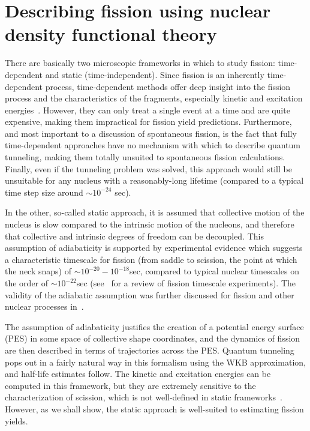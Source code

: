 \chapter{Describing fission using nuclear density functional theory}\label{chap:Model}


There are basically two microscopic frameworks in which to study fission: time-dependent and static (time-independent). Since fission is an inherently time-dependent process, time-dependent methods offer deep insight into the fission process and the characteristics of the fragments, especially kinetic and excitation energies~\cite{Scamps2018, Scamps2015a, Simenel2014, Grineviciute2018, Umar2010}. However, they can only treat a single event at a time and are quite expensive, making them impractical for fission yield predictions. Furthermore, and most important to a discussion of spontaneous fission, is the fact that fully time-dependent approaches have no mechanism with which to describe quantum tunneling, making them totally unsuited to spontaneous fission calculations. Finally, even if the tunneling problem was solved, this approach would still be unsuitable for any nucleus with a reasonably-long lifetime (compared to a typical time step size around ${\sim}10^{-24}$ sec).

In the other, so-called static approach, it is assumed that collective motion of the nucleus is slow compared to the intrinsic motion of the nucleons, and therefore that collective and intrinsic degrees of freedom can be decoupled. This assumption of adiabaticity is supported by experimental evidence which suggests a characteristic timescale for fission (from saddle to scission, the point at which the neck snaps) of ${\sim}10^{-20}-10^{-18}$sec, compared to typical nuclear timescales on the order of ${\sim}10^{-22}$sec (see~\cite{Jacquet2009} for a review of fission timescale experiments). The validity of the adiabatic assumption was further discussed for fission and other nuclear processes in~\cite{Nazarewicz1993}.

The assumption of adiabaticity justifies the creation of a potential energy surface (PES) in some space of collective shape coordinates, and the dynamics of fission are then described in terms of trajectories across the PES. Quantum tunneling pops out in a fairly natural way in this formalism using the WKB approximation, and half-life estimates follow. The kinetic and excitation energies can be computed in this framework, but they are extremely sensitive to the characterization of scission, which is not well-defined in static frameworks~\cite{Younes2011}. However, as we shall show, the static approach is well-suited to estimating fission yields.

